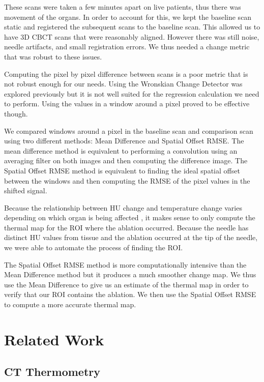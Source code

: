 \documentclass[]{spie}  %
\begin{document}
These scans were taken a few minutes apart on live patients, thus there was movement of the organs. In order to account for this, we kept the baseline scan static and registered the subsequent scans to the baseline scan. This allowed us to have 3D CBCT scans that were reasonably aligned. However there was still noise, needle artifacts, and small registration errors. We thus needed a change metric that was robust to these issues. 

Computing the pixel by pixel difference between scans is a poor metric that is not robust enough for our needs. Using the Wronskian Change Detector was explored previously \cite{Li13} but it is not well suited for the regression calculation we need to perform. Using the values in a window around a pixel proved to be effective though. 

We compared windows around a pixel in the baseline scan and comparison scan using two different methods: Mean Difference and Spatial Offset RMSE. The mean difference method is equivalent to performing a convolution using an averaging filter on both images and then computing the difference image. The Spatial Offset RMSE method is equivalent to finding the ideal spatial offset between the windows and then computing the RMSE of the pixel values in the shifted signal. 

Because the relationship between HU change and temperature change varies depending on which organ is being affected \cite{Fani14}, it makes sense to only compute the thermal map for the ROI where the ablation occurred. Because the needle has distinct HU values from tissue and the ablation occurred at the tip of the needle, we were able to automate the process of finding the ROI. 

The Spatial Offset RMSE method is more computationally intensive than the Mean Difference method but it produces a much smoother change map. We thus use the Mean Difference to give us an estimate of the thermal map in order to verify that our ROI contains the ablation. We then use the Spatial Offset RMSE to compute a more accurate thermal map. 

\section{Related Work}

\subsection{CT Thermometry}
\end{document}
